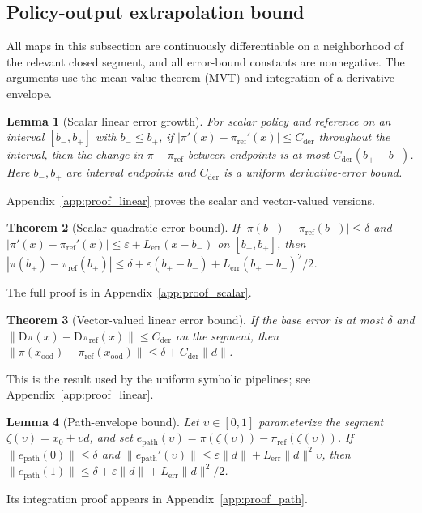\documentclass[10pt]{article}
\newtheorem{theorem}{Theorem}[section]
\newtheorem{lemma}[theorem]{Lemma}
\begin{document}
\subsection{Policy-output extrapolation bound}
\label{sec:main_thm}

All maps in this subsection are continuously differentiable on a neighborhood of the relevant closed segment, and all error-bound constants are nonnegative. The arguments use the mean value theorem (MVT) and integration of a derivative envelope.

\begin{lemma}[Scalar linear error growth]
\label{lem:error_linear}
For scalar policy and reference on an interval $[b_-,b_+]$ with $b_-\leq b_+$, if
$|\pi'(x)-\pi_{\mathrm{ref}}'(x)|\leq C_{\mathrm{der}}$
throughout the interval, then the change in $\pi-\pi_{\mathrm{ref}}$ between endpoints is at most
$C_{\mathrm{der}}(b_+-b_-)$.
Here $b_-,b_+$ are interval endpoints and $C_{\mathrm{der}}$ is a uniform derivative-error bound.
\end{lemma}
Appendix~\ref{app:proof_linear} proves the scalar and vector-valued versions.

\begin{theorem}[Scalar quadratic error bound]
\label{thm:ood_1d}
If $|\pi(b_-)-\pi_{\mathrm{ref}}(b_-)|\leq\delta$ and
$|\pi'(x)-\pi_{\mathrm{ref}}'(x)|\leq\varepsilon+
L_{\mathrm{err}}(x-b_-)$ on $[b_-,b_+]$, then
$|\pi(b_+)-\pi_{\mathrm{ref}}(b_+)|
\leq\delta+\varepsilon(b_+-b_-)+
L_{\mathrm{err}}(b_+-b_-)^2/2$.
\end{theorem}
The full proof is in Appendix~\ref{app:proof_scalar}.

\begin{theorem}[Vector-valued linear error bound]
\label{thm:ood_linear_nD}
If the base error is at most $\delta$ and
$\|\mathrm{D}\pi(x)-\mathrm{D}\pi_{\mathrm{ref}}(x)\|
\leq C_{\mathrm{der}}$ on the segment, then
$\|\pi(x_{\mathrm{ood}})-\pi_{\mathrm{ref}}(x_{\mathrm{ood}})\|
\leq\delta+C_{\mathrm{der}}\|d\|$.
\end{theorem}
This is the result used by the uniform symbolic pipelines; see Appendix~\ref{app:proof_linear}.

\begin{lemma}[Path-envelope bound]
\label{lem:path_fencing}
Let $\upsilon\in[0,1]$ parameterize the segment
$\zeta(\upsilon)=x_0+\upsilon d$, and set
$e_{\mathrm{path}}(\upsilon)=\pi(\zeta(\upsilon))-
\pi_{\mathrm{ref}}(\zeta(\upsilon))$.
If $\|e_{\mathrm{path}}(0)\|\leq\delta$ and
$\|e_{\mathrm{path}}'(\upsilon)\|\leq
\varepsilon\|d\|+L_{\mathrm{err}}\|d\|^2\upsilon$, then
$\|e_{\mathrm{path}}(1)\|\leq
\delta+\varepsilon\|d\|+L_{\mathrm{err}}\|d\|^2/2$.
\end{lemma}
Its integration proof appears in Appendix~\ref{app:proof_path}.
\end{document}
